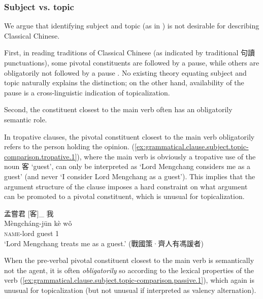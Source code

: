 \documentclass[UTF8, a4paper, oneside, scheme=plain, 12pt]{ctexrep}
\newcommand*{\citepages}[1]{pp.~{#1}}
\newcommand{\translate}[1]{`#1'}
\newcommand*{\category}[1]{\textsc{#1}}
\begin{document}
\subsubsection{Subject vs. topic}\label{sec:grammatical.clause.subject.topic-comparison}

We argue that identifying subject and topic (as in \citealt[\citepages{41-42}]{li2004grammar}) is not desirable for describing Classical Chinese.

First, in reading traditions of Classical Chinese (as indicated by traditional 句讀 punctuations), some pivotal constituents are followed by a pause,
while others are obligatorily not followed by a pause \citep[\citepages{121-122}]{meiguang2018}. 
No existing theory equating subject and topic naturally explains the distinction;
on the other hand, availability of the pause is a cross-linguistic indication of topicalization.

Second, the constituent closest to the main verb often has an obligatorily semantic role.

In tropative clauses, the pivotal constituent closest to the main verb 
obligatorily refers to the person holding the opinion.
(\ref{ex:grammatical.clause.subject.topic-comparison.tropative.1}),
where the main verb is obviously a tropative use of the noun 客 \translate{guest},
can only be interpreted as \translate{Lord Mengchang considers me as a guest}
(and never \translate{I consider Lord Mengchang as a guest}).
This implies that the argument structure of the clause imposes a hard constraint on 
what argument can be promoted to a pivotal constituent,
which is unusual for topicalization.

\begin{exe}
    \ex\label{ex:grammatical.clause.subject.topic-comparison.tropative.1}
    \glll
    孟嘗君 [客]_{} 我 \\
    Mèngcháng-jūn kè wǒ \\
    \category{name}-lord guest 1 \\
    \glt\translate{Lord Mengchang treats me as a guest.} \hfill (戰國策·齊人有馮諼者)
\end{exe}

When the pre-verbal pivotal constituent closest to the main verb is semantically not the agent,
it is often \emph{obligatorily} so according to the lexical properties of the verb (\ref{ex:grammatical.clause.subject.topic-comparison.passive.1}),
which again is unusual for topicalization
(but not unusual if interpreted as valency alternation).
\end{document}
